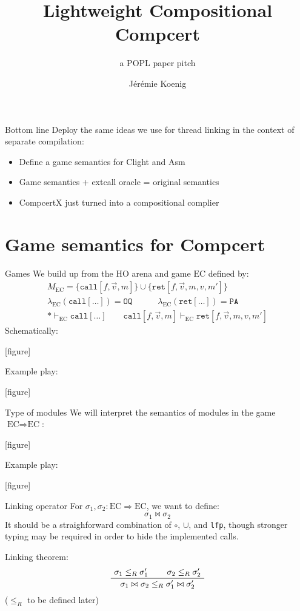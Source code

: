 \documentclass[handout]{beamer}
\title{Lightweight Compositional Compcert}
\subtitle{a POPL paper pitch}
\author{J\'er\'emie Koenig}
\newcommand{\EC}{\text{EC}}
\newcommand{\ECEC}{\EC \Rightarrow \EC}
\newcommand{\kw}[1]{\texttt{#1}}
\begin{document}
\begin{frame}
\titlepage
\end{frame}

\begin{frame}{Bottom line} %
Deploy the same ideas we use for thread linking
in the context of separate compilation:
\begin{itemize}
\item Define a game semantics for Clight and Asm
\item Game semantics + extcall oracle = original semantics
\item CompcertX just turned into a compositional complier
\end{itemize}
\end{frame}

\section{Game semantics for Compcert}

\begin{frame}{Games} %
We build up from the HO arena and game $\EC$ defined by:
\begin{gather*}
M_\EC = \{ \kw{call}[f, \vec{v}, m] \} \cup
        \{ \kw{ret}[f, \vec{v}, m, v, m'] \} \\
\lambda_\EC(\kw{call}[\ldots]) = \kw{OQ} \hspace{3em}
\lambda_\EC(\kw{ret}[\ldots]) = \kw{PA} \\
* \vdash_\EC \kw{call}[\ldots] \hspace{2em}
\kw{call}[f, \vec{v}, m] \vdash_\EC \kw{ret}[f, \vec{v}, m, v, m']
\end{gather*}
Schematically:
\begin{center}
[figure]
\end{center}
Example play:
\begin{center}
[figure]
\end{center}
\end{frame}

\begin{frame}{Type of modules} %
We will interpret the semantics of modules in the game $\ECEC$:
\begin{center}
[figure]
\end{center}
Example play:
\begin{center}
[figure]
\end{center}
\end{frame}

\begin{frame}{Linking operator} %
For $\sigma_1, \sigma_2 : \ECEC$,
we want to define:
\[ \sigma_1 \bowtie \sigma_2 \]
It should be a straighforward combination
of $\circ$, $\cup$, and \kw{lfp},
though stronger typing may be required
in order to hide the implemented calls.

Linking theorem:
\[
        \AxiomC{$\sigma_1 \le_R \sigma_1'$}
        \AxiomC{$\sigma_2 \le_R \sigma_2'$}
        \BinaryInfC{$\sigma_1 \bowtie \sigma_2 \le_R \sigma_1' \bowtie \sigma_2'$}
        \DisplayProof
\]
($\le_R$ to be defined later)
\end{frame}
\end{document}
